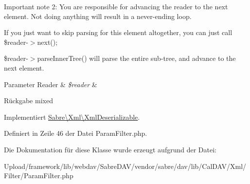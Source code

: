 Important note 2\+: You are responsible for advancing the reader to the next element. Not doing anything will result in a never-\/ending loop.

If you just want to skip parsing for this element altogether, you can just call \$reader-\/$>$next();

\$reader-\/$>$parse\+Inner\+Tree() will parse the entire sub-\/tree, and advance to the next element.


\begin{DoxyParams}[1]{Parameter}
Reader & {\em \$reader} & \\
\hline
\end{DoxyParams}
\begin{DoxyReturn}{Rückgabe}
mixed 
\end{DoxyReturn}


Implementiert \mbox{\hyperlink{interface_sabre_1_1_xml_1_1_xml_deserializable_a19e0eca545b9a0d93f7d6b69085ade30}{Sabre\textbackslash{}\+Xml\textbackslash{}\+Xml\+Deserializable}}.



Definiert in Zeile 46 der Datei Param\+Filter.\+php.



Die Dokumentation für diese Klasse wurde erzeugt aufgrund der Datei\+:\begin{DoxyCompactItemize}
\item 
Upload/framework/lib/webdav/\+Sabre\+D\+A\+V/vendor/sabre/dav/lib/\+Cal\+D\+A\+V/\+Xml/\+Filter/Param\+Filter.\+php\end{DoxyCompactItemize}
